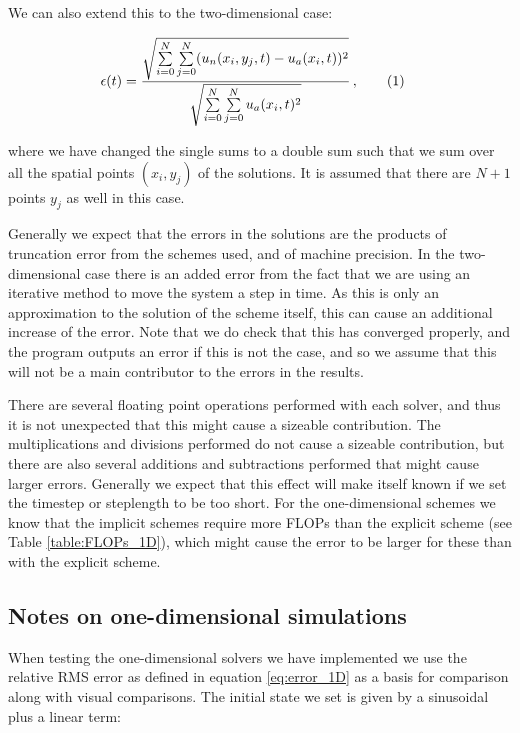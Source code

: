 \documentclass[reprint,english,notitlepage]{revtex4-1}  %
\newcommand\numberthis{\addtocounter{equation}{1}\tag{\theequation}}
\begin{document}
We can also extend this to the two-dimensional case:

\begin{align*}
\epsilon(t) &= \frac{\sqrt{\sum\limits_{i=0}^N \sum\limits_{j=0}^N (u_n(x_i,y_j,t) - u_a(x_i,t))^2}}{\sqrt{\sum\limits_{i=0}^N \sum\limits_{j=0}^N u_a(x_i,t)^2}} \, , \numberthis \label{eq:error_2D}
\end{align*}

where we have changed the single sums to a double sum such that we sum over all the spatial points $(x_i,y_j)$ of the solutions. It is assumed that there are $N+1$ points $y_j$ as well in this case.

Generally we expect that the errors in the solutions are the products of truncation error from the schemes used, and of machine precision. In the two-dimensional case there is an added error from the fact that we are using an iterative method to move the system a step in time. As this is only an approximation to the solution of the scheme itself, this can cause an additional increase of the error. Note that we do check that this has converged properly, and the program outputs an error if this is not the case, and so we assume that this will not be a main contributor to the errors in the results.

There are several floating point operations performed with each solver, and thus it is not unexpected that this might cause a sizeable contribution. The multiplications and divisions performed do not cause a sizeable contribution, but there are also several additions and subtractions performed that might cause larger errors. Generally we expect that this effect will make itself known if we set the timestep or steplength to be too short. For the one-dimensional schemes we know that the implicit schemes require more FLOPs than the explicit scheme (see Table \ref{table:FLOPs_1D}), which might cause the error to be larger for these than with the explicit scheme. 





\subsection{Notes on one-dimensional simulations} \label{sec:method_1D_sims}

When testing the one-dimensional solvers we have implemented we use the relative RMS error as defined in equation \eqref{eq:error_1D} as a basis for comparison along with visual comparisons. The initial state we set is given by a sinusoidal plus a linear term:
\end{document}
